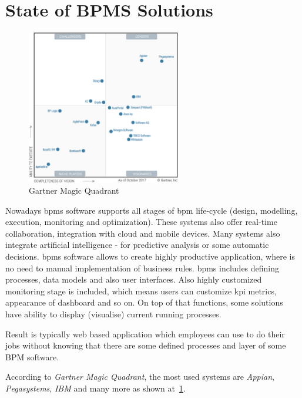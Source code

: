 \section{State of BPMS Solutions}

\begin{figure}[ht!]
	\centering
    \includegraphics[width=0.6\textwidth, keepaspectratio]{img/gartner-magic-quadrant.png}
    \caption{Gartner Magic Quadrant\cite{gartner-2017} }
    \label{fig:gartner-magic-quadrant}
\end{figure}

Nowadays \gls{bpms} software supports all stages of \gls{bpm} life-cycle (design, modelling, execution, monitoring and optimization). These systems also offer real-time collaboration, integration with cloud and mobile devices. Many systems also integrate artificial intelligence - for predictive analysis or some automatic decisions. \gls{bpms} software allows to create highly productive application, where is no need to manual implementation of business rules. \gls{bpms} includes defining processes, data models and also user interfaces. Also highly customized monitoring stage is included, which means users can customize \gls{kpi} metrics, appearance of dashboard and so on. On top of that functions, some solutions have ability to display (visualise) current running processes.  

Result is typically web based application which employees can use to do their jobs without knowing that there are some defined processes and layer of some BPM software. 

According to \textit{Gartner Magic Quadrant}\cite{gartner-2017}, the most used systems are \textit{Appian}, \textit{Pegasystems}, \textit{IBM} and many more as shown at~\cref{fig:gartner-magic-quadrant}.

